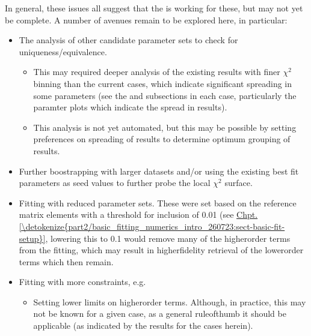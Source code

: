 \documentclass[letterpaper,table,10pt,english]{jupyterBook}
\begin{document}
\sphinxAtStartPar
In general, these issues all suggest that the {\hyperref[\detokenize{backmatter/glossary:term-bootstrap-retrieval-protocol}]{}} is working for these, but may not yet be complete. A number of avenues remain to be explored here, in particular:
\begin{itemize}
\item {} 
\sphinxAtStartPar
The analysis of other candidate parameter sets to check for uniqueness/equivalence.
\begin{itemize}
\item {} 
\sphinxAtStartPar
This may required deeper analysis of the existing results with finer \(\chi^2\) binning than the current cases, which indicate significant spreading in some parameters (see the  and  subsections in each case, particularly the paramter plots which indicate the spread in results).

\item {} 
\sphinxAtStartPar
This analysis is not yet automated, but this may be possible by setting preferences on spreading of results to determine optimum grouping of results.

\end{itemize}

\item {} 
\sphinxAtStartPar
Further boostrapping with larger datasets and/or using the existing best fit parameters as seed values to further probe the local \(\chi^2\) surface.

\item {} 
\sphinxAtStartPar
Fitting with reduced parameter sets. These were set based on the reference matrix elements with a threshold for inclusion of 0.01 (see \hyperref[\detokenize{part2/basic_fitting_numerics_intro_260723:sect-basic-fit-setup}]{Chpt.\@ \ref{\detokenize{part2/basic_fitting_numerics_intro_260723:sect-basic-fit-setup}}}, lowering this to 0.1 would remove many of the higher\sphinxhyphen{}order terms from the fitting, which may result in higher\sphinxhyphen{}fidelity retrieval of the lower\sphinxhyphen{}order terms which then remain.

\item {} 
\sphinxAtStartPar
Fitting with more constraints, e.g.
\begin{itemize}
\item {} 
\sphinxAtStartPar
Setting lower limits on higher\sphinxhyphen{}order terms. Although, in practice, this may not be known  for a given case, as a general rule\sphinxhyphen{}of\sphinxhyphen{}thumb it should be applicable (as indicated by the  results for the cases herein).


\end{itemize}
\end{itemize}
\end{document}
